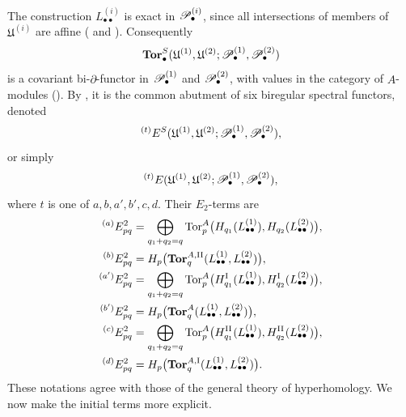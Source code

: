 \begin{env}[6.6.2]
The construction $L_{\bullet\bullet}^{(i)}$ is exact in
$\mathscr{P}_\bullet^{(i)}$, since all intersections of members of
$\mathfrak U^{(i)}$ are affine
( and ).  Consequently
\[
  \mathbf{Tor}_\bullet^S
  (\mathfrak U^{(1)},\mathfrak U^{(2)};
   \mathscr{P}_\bullet^{(1)},\mathscr{P}_\bullet^{(2)})
\]
is a covariant bi-$\partial$-functor in
$\mathscr{P}_\bullet^{(1)}$ and $\mathscr{P}_\bullet^{(2)}$, with values in
the category of $A$-modules ().  By
, it is the common abutment of six biregular
spectral functors, denoted
\[
  {}^{(t)}E^S
  (\mathfrak U^{(1)},\mathfrak U^{(2)};
   \mathscr{P}_\bullet^{(1)},\mathscr{P}_\bullet^{(2)}),
\]
or simply
\[
  {}^{(t)}E
  (\mathfrak U^{(1)},\mathfrak U^{(2)};
   \mathscr{P}_\bullet^{(1)},\mathscr{P}_\bullet^{(2)}),
\]
where $t$ is one of $a,b,a',b',c,d$.  Their $E_2$-terms are
\[
\begin{aligned}
  {}^{(a)}E_{pq}^2
  &=
  \bigoplus_{q_1+q_2=q}
  \operatorname{Tor}_p^A
  \bigl(H_{q_1}(L_{\bullet\bullet}^{(1)}),
        H_{q_2}(L_{\bullet\bullet}^{(2)})\bigr),\\
  {}^{(b)}E_{pq}^2
  &=
  H_p\bigl(
    \mathbf{Tor}_q^{A,\mathrm{II}}
    (L_{\bullet\bullet}^{(1)},L_{\bullet\bullet}^{(2)})
  \bigr),\\
  {}^{(a')}E_{pq}^2
  &=
  \bigoplus_{q_1+q_2=q}
  \operatorname{Tor}_p^A
  \bigl(H_{q_1}^{\mathrm I}(L_{\bullet\bullet}^{(1)}),
        H_{q_2}^{\mathrm I}(L_{\bullet\bullet}^{(2)})\bigr),\\
  {}^{(b')}E_{pq}^2
  &=
  H_p\bigl(
    \mathbf{Tor}_q^A
    (L_{\bullet\bullet}^{(1)},L_{\bullet\bullet}^{(2)})
  \bigr),\\
  {}^{(c)}E_{pq}^2
  &=
  \bigoplus_{q_1+q_2=q}
  \operatorname{Tor}_p^A
  \bigl(H_{q_1}^{\mathrm{II}}(L_{\bullet\bullet}^{(1)}),
        H_{q_2}^{\mathrm{II}}(L_{\bullet\bullet}^{(2)})\bigr),\\
  {}^{(d)}E_{pq}^2
  &=
  H_p\bigl(
    \mathbf{Tor}_q^{A,\mathrm I}
    (L_{\bullet\bullet}^{(1)},L_{\bullet\bullet}^{(2)})
  \bigr).
\end{aligned}
\]
These notations agree with those of the general theory of
hyperhomology.  We now make the initial terms more explicit.
\end{env}

